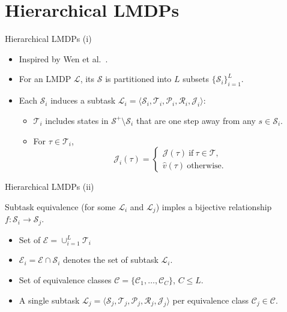 \documentclass{beamer}
\theoremstyle{mystyle}
\newcommand{\cC}{\mathcal{C}}
\newcommand{\cE}{\mathcal{E}}
\newcommand{\cJ}{\mathcal{J}}
\newcommand{\cL}{\mathcal{L}}
\newcommand{\cP}{\mathcal{P}}
\newcommand{\cR}{\mathcal{R}}
\newcommand{\cS}{\mathcal{S}}
\newcommand{\cT}{\mathcal{T}}
\begin{document}
\section{Hierarchical LMDPs}
\begin{frame}{Hierarchical LMDPs (i)}

    \begin{itemize}
        \item Inspired by Wen et al.~\citep{conf/nips/Wen20}. 
        \item For an LMDP $\cL$, its {\color{blue} $\cS$ is partitioned} into $L$ subsets $\{\cS_i\}_{i=1}^L$. 
        \item Each $\cS_i$ induces a subtask $\cL_i=\langle\cS_i,\cT_i,\cP_i,\cR_i,\cJ_i\rangle$:
        \begin{itemize}
        \item $\cT_i$ includes states in $\cS^+\setminus\cS_i$ that are one step away from any $s \in \cS_i$.
        \item For $\tau\in\cT_i$,
        \[
            \cJ_i(\tau)=\begin{cases}
                            \cJ(\tau) \ \text{if} \ \tau\in\cT, \\
                            \hat{v}(\tau) \ \text{otherwise.}
                        \end{cases}
        \]
        \end{itemize}
\end{itemize}

\end{frame}

\begin{frame}{Hierarchical LMDPs (ii)}

\begin{definition}
Subtask equivalence (for some $\cL_i$ and $\cL_j$) imples a bijective relationship $f:\cS_i\rightarrow\cS_j$.
\end{definition}

\begin{itemize}
     
    \item Set of  {\color{blue}{\em exit states}} $\cE=\cup_{i=1}^L\cT_i$
    \item $\cE_i=\cE\cap\cS_i$ denotes the set of {\color{blue}{\em exit states inside}} subtask $\cL_i$. 
    \item Set of {\color{blue} equivalence classes} $\cC=\{\cC_1,\ldots,\cC_C\}$, $C\leq L$.
    \item {\color{blue} A single subtask} $\cL_j=\langle\cS_j,\cT_j,\cP_j,\cR_j,\cJ_j\rangle$ {\color{blue} per equivalence class} $\cC_j\in\cC$. 
    
\end{itemize}

    
\end{frame}
\end{document}
